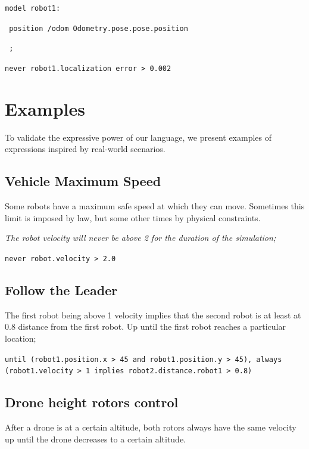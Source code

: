 \documentclass[runningheads]{llncs}
\begin{document}
\vspace{2mm}

\texttt{model robot1:}

\texttt{    position /odom Odometry.pose.pose.position}

\texttt{    ;}

\vspace{2mm}

\texttt{never robot1.localization error > 0.002}


\section{Examples}

To validate the expressive power of our language, we present examples of expressions inspired by real-world scenarios.


\subsection{Vehicle Maximum Speed}

Some robots have a maximum safe speed at which they can move. Sometimes this limit is imposed by law, but some other times by physical constraints.


\textit{The robot velocity will never be above 2 for the duration of the simulation;}

\vspace{2mm}

\texttt{never robot.velocity > 2.0}

\subsection{Follow the Leader}

The first robot being above 1 velocity implies that the second robot is at least at 0.8 distance from the first robot. Up until the first robot reaches a particular location;

\vspace{2mm}

\texttt{until (robot1.position.x > 45 and robot1.position.y > 45), always (robot1.velocity > 1 implies robot2.distance.robot1 > 0.8)}


\subsection{Drone height rotors control}

After a drone is at a certain altitude, both rotors always have the same velocity up until the drone decreases to a certain altitude.
\end{document}

